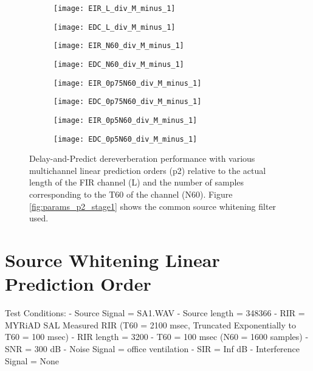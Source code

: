 \begin{figure}[H]
	\centering
	\begin{subfigure}[b]{0.4\textwidth}
		\centering
		\texttt{[image: EIR\_L\_div\_M\_minus\_1]}
	\end{subfigure}
	\begin{subfigure}[b]{0.4\textwidth}
		\centering
		\texttt{[image: EDC\_L\_div\_M\_minus\_1]}
	\end{subfigure}
	\begin{subfigure}[b]{0.4\textwidth}
		\centering
		\texttt{[image: EIR\_N60\_div\_M\_minus\_1]}
	\end{subfigure}
	\begin{subfigure}[b]{0.4\textwidth}
		\centering
		\texttt{[image: EDC\_N60\_div\_M\_minus\_1]}
	\end{subfigure}
	\begin{subfigure}[b]{0.4\textwidth}
		\centering
		\texttt{[image: EIR\_0p75N60\_div\_M\_minus\_1]}
	\end{subfigure}
	\begin{subfigure}[b]{0.4\textwidth}
		\centering
		\texttt{[image: EDC\_0p75N60\_div\_M\_minus\_1]}
	\end{subfigure}
	\begin{subfigure}[b]{0.4\textwidth}
		\centering
		\texttt{[image: EIR\_0p5N60\_div\_M\_minus\_1]}
	\end{subfigure}
	\begin{subfigure}[b]{0.4\textwidth}
		\centering
		\texttt{[image: EDC\_0p5N60\_div\_M\_minus\_1]}
	\end{subfigure}
	\caption{Delay-and-Predict dereverberation performance with various multichannel linear prediction orders (p2) relative to the actual length of the FIR channel (L) and the number of samples corresponding to the T60 of the channel (N60). Figure \ref{fig:params_p2_stage1} shows the common source whitening filter used.}
	\label{fig:params_p2_compare}
\end{figure}

\section{Source Whitening Linear Prediction Order}


Test Conditions:
- Source Signal = SA1.WAV
- Source length = 348366
- RIR = MYRiAD SAL Measured RIR (T60 = 2100 msec, Truncated Exponentially to T60 = 100 msec)
- RIR length = 3200
- T60 = 100 msec (N60 = 1600 samples)
- SNR = 300 dB
- Noise Signal = office ventilation
- SIR = Inf dB
- Interference Signal = None

